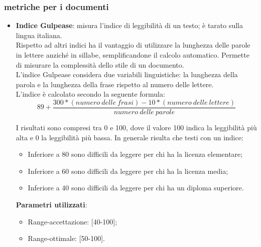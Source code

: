 {\subsubsection{metriche per i documenti}{
	\label{sec:metricadocumenti}
	\begin{itemize}
		\item \textbf{Indice Gulpease}: misura l'indice di leggibilità di un testo; è tarato sulla lingua italiana.\\
		Rispetto ad altri indici ha il vantaggio di utilizzare la lunghezza delle parole in lettere anziché in sillabe, semplificandone il calcolo automatico. Permette di misurare la complessità dello stile di un documento.\\
		L'indice Gulpease considera due variabili linguistiche: la lunghezza della parola e la lunghezza della frase rispetto al numero delle lettere.\\
		L'indice è calcolato secondo la seguente formula:\\
		
		\[89 + \frac{300 *(numero\ delle\ frasi) -10 *(numero\ delle\ lettere)}{numero\ delle\ parole}\]
		
		I risultati sono compresi tra 0 e 100, dove il valore 100 indica la leggibilità più alta e 0 la leggibilità più bassa. In generale risulta che testi con un indice:
		
		\begin{itemize}
			\item Inferiore a 80 sono difficili da leggere per chi ha la licenza elementare;
			\item Inferiore a 60 sono difficili da leggere per chi ha la licenza media;
			\item Inferiore a 40 sono difficili da leggere per chi ha un diploma superiore.
		\end{itemize}
		
		\textbf{Parametri utilizzati}:
		\begin{itemize}
			\item Range-accettazione: [40-100];
			\item Range-ottimale: [50-100].
		\end{itemize}
	\end{itemize}
	}
}
